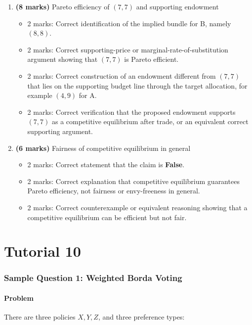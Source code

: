\documentclass[12pt]{article}
\begin{document}
\begin{enumerate}[label=(\alph*)]
    \item \textbf{(8 marks)} Pareto efficiency of \((7,7)\) and supporting endowment
    \begin{itemize}
        \item 2 marks: Correct identification of the implied bundle for B, namely \((8,8)\).
        \item 2 marks: Correct supporting-price or marginal-rate-of-substitution argument showing that \((7,7)\) is Pareto efficient.
        \item 2 marks: Correct construction of an endowment different from \((7,7)\) that lies on the supporting budget line through the target allocation, for example \((4,9)\) for A.
        \item 2 marks: Correct verification that the proposed endowment supports \((7,7)\) as a competitive equilibrium after trade, or an equivalent correct supporting argument.
    \end{itemize}

    \item \textbf{(6 marks)} Fairness of competitive equilibrium in general
    \begin{itemize}
        \item 2 marks: Correct statement that the claim is \textbf{False}.
        \item 2 marks: Correct explanation that competitive equilibrium guarantees Pareto efficiency, not fairness or envy-freeness in general.
        \item 2 marks: Correct counterexample or equivalent reasoning showing that a competitive equilibrium can be efficient but not fair.
    \end{itemize}
\end{enumerate}


\newpage
\part{Tutorial 10}
\section{Sample Question 1: Weighted Borda Voting}

\subsection{Problem}

There are three policies \(X,Y,Z\), and three preference types:
\end{document}
